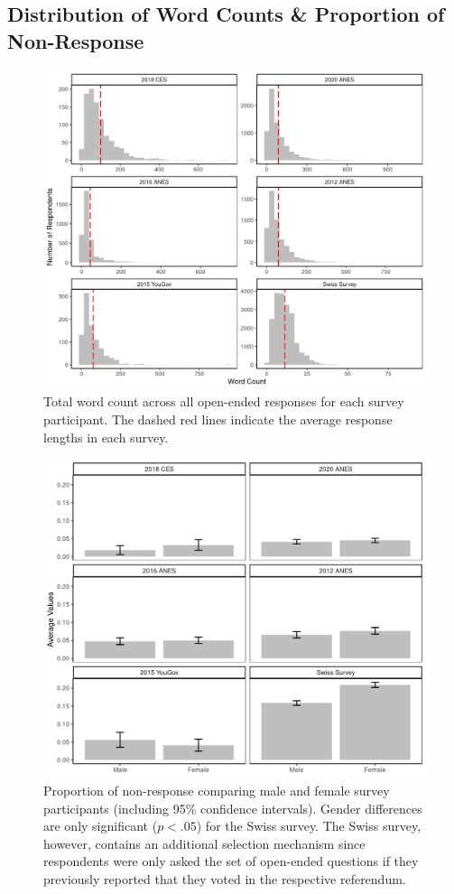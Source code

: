 \subsection{Distribution of Word Counts \& Proportion of Non-Response}
\begin{figure}[ht]\centering
	\includegraphics{../fig/wc.png}
	\caption[Total word count across all open-ended responses]{Total word count across all open-ended responses for each survey participant. The dashed red lines indicate the average response lengths in each survey.}\label{fig:wc}
\end{figure}

\begin{figure}[ht]\centering
	\includegraphics{../fig/noresponse.png}
	\caption{Proportion of non-response comparing male and female survey participants (including 95\% confidence intervals). Gender differences are only significant ($p<.05$) for the Swiss survey. The Swiss survey, however, contains an additional selection mechanism since respondents were only asked the set of open-ended questions if they previously reported that they voted in the respective referendum.}
\end{figure}


